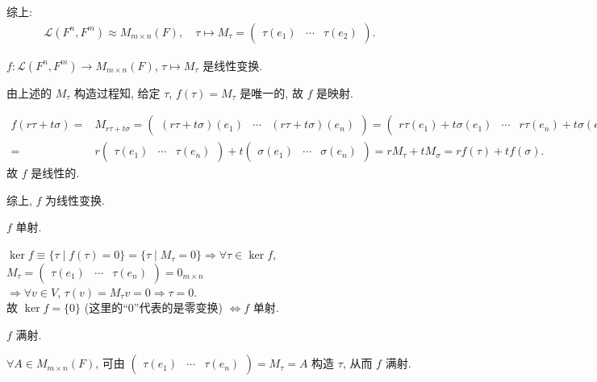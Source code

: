 \documentclass{note}
\begin{document}
综上:
\begin{align*}
    \boxed{\mathcal{L}(F^n,F^m)\approx M_{m\times n}(F),\quad\tau\mapsto M_{\tau}=\begin{pmatrix}
        \tau(e_1)&\cdots&\tau(e_2)
    \end{pmatrix}}.
\end{align*}

$f:\mathcal{L}(F^n,F^m)\rightarrow M_{m\times n}(F)$, $\tau\mapsto M_{\tau}$ 是线性变换.
\begin{pf}
    由上述的 $M_{\tau}$ 构造过程知, 给定 $\tau$, $f(\tau)=M_{\tau}$ 是唯一的, 故 $f$ 是映射.

    \begin{align*}
        f(r\tau+t\sigma)=&M_{r\tau+t\sigma}=\begin{pmatrix}
            (r\tau+t\sigma)(e_1)&\cdots&(r\tau+t\sigma)(e_n)
        \end{pmatrix}=\begin{pmatrix}
            r\tau(e_1)+t\sigma(e_1)&\cdots&r\tau(e_n)+t\sigma(e_n)
        \end{pmatrix}\\
        =&r\begin{pmatrix}
            \tau(e_1)&\cdots&\tau(e_n)
        \end{pmatrix}+t\begin{pmatrix}
            \sigma(e_1)&\cdots&\sigma(e_n)
        \end{pmatrix}=rM_{\tau}+tM_{\sigma}=rf(\tau)+tf(\sigma).
    \end{align*}
    故 $f$ 是线性的.

    综上, $f$ 为线性变换.
\end{pf}

$f$ 单射.
\begin{pf}
    $\ker f\equiv\{\tau\mid f(\tau)=0\}=\{\tau\mid M_{\tau}=0\}\Longrightarrow\forall\tau\in\ker f$, $M_{\tau}=\begin{pmatrix}
        \tau(e_1)&\cdots&\tau(e_n)
    \end{pmatrix}=0_{m\times n}$\\
    $\Longrightarrow\forall v\in V$, $\tau(v)=M_{\tau}v=0\Longrightarrow\tau=0$.\\
    故 $\ker f=\{0\}$ (这里的``$0$''代表的是零变换) $\Longleftrightarrow f$ 单射.
\end{pf}

$f$ 满射.
\begin{pf}
    $\forall A\in M_{m\times n}(F)$, 可由 $\begin{pmatrix}
        \tau(e_1)&\cdots&\tau(e_n)
    \end{pmatrix}=M_{\tau}=A$ 构造 $\tau$, 从而 $f$ 满射.
\end{pf}
\end{document}
